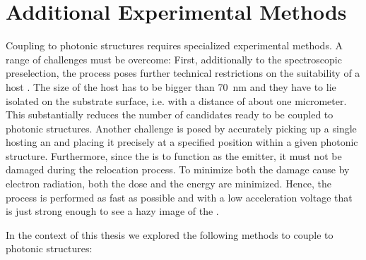 	\section{Additional Experimental Methods} \label{sec::methods_coupling}

	Coupling \sivs to photonic structures requires specialized experimental methods.
	A range of challenges must be overcome:
	First, additionally to the spectroscopic preselection, the \pp process poses further technical restrictions on the suitability of a host \nd.
	The size of the host \nd has to be bigger than \SI{70}{nm} and they have to lie isolated on the substrate surface, i.e. with a distance of about one micrometer.
	This substantially reduces the number of \siv candidates ready to be coupled to photonic structures.
	Another challenge is posed by accurately picking up a single \nd hosting an \siv and placing it precisely at a specified position within a given photonic structure.
	Furthermore, since the \siv is to function as the \pl emitter, it must not be damaged during the relocation process.
	To minimize both the damage cause by electron radiation, both the dose and the energy are minimized.
	Hence, the \pp process is performed as fast as possible and with a low acceleration voltage that is just strong enough to see a hazy image of the \nd.


	In the context of this thesis we explored the following methods to couple \nds to photonic structures:

